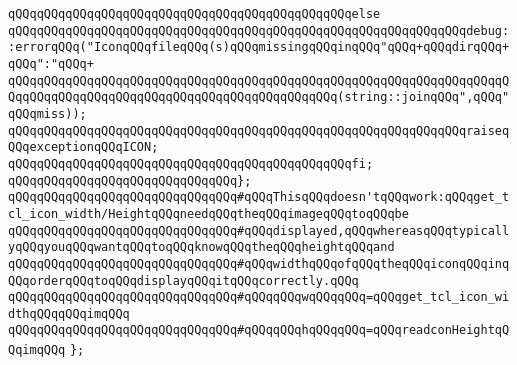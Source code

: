 \verb|qQQqqQQqqQQqqQQqqQQqqQQqqQQqqQQqqQQqqQQqqQQqqQQqelse|\newline
\verb|qQQqqQQqqQQqqQQqqQQqqQQqqQQqqQQqqQQqqQQqqQQqqQQqqQQqqQQqqQQqqQQqdebug::errorqQQq("IconqQQqfileqQQq(s)qQQqmissingqQQqinqQQq"qQQq+qQQqdirqQQq+qQQq":"qQQq+|\newline
\verb|qQQqqQQqqQQqqQQqqQQqqQQqqQQqqQQqqQQqqQQqqQQqqQQqqQQqqQQqqQQqqQQqqQQqqQQqqQQqqQQqqQQqqQQqqQQqqQQqqQQqqQQqqQQqqQQqqQQq(string::joinqQQq",qQQq"qQQqmiss));|\newline
\newline
\verb|qQQqqQQqqQQqqQQqqQQqqQQqqQQqqQQqqQQqqQQqqQQqqQQqqQQqqQQqqQQqqQQqraiseqQQqexceptionqQQqICON;|\newline
\verb|qQQqqQQqqQQqqQQqqQQqqQQqqQQqqQQqqQQqqQQqqQQqqQQqfi;|\newline
\verb|qQQqqQQqqQQqqQQqqQQqqQQqqQQqqQQq};|\newline
\newline
\verb|qQQqqQQqqQQqqQQqqQQqqQQqqQQqqQQq#qQQqThisqQQqdoesn'tqQQqwork:qQQqget_tcl_icon_width/HeightqQQqneedqQQqtheqQQqimageqQQqtoqQQqbe|\newline
\verb|qQQqqQQqqQQqqQQqqQQqqQQqqQQqqQQq#qQQqdisplayed,qQQqwhereasqQQqtypicallyqQQqyouqQQqwantqQQqtoqQQqknowqQQqtheqQQqheightqQQqand|\newline
\verb|qQQqqQQqqQQqqQQqqQQqqQQqqQQqqQQq#qQQqwidthqQQqofqQQqtheqQQqiconqQQqinqQQqorderqQQqtoqQQqdisplayqQQqitqQQqcorrectly.qQQq|\newline
\newline
\verb|qQQqqQQqqQQqqQQqqQQqqQQqqQQqqQQq#qQQqqQQqwqQQqqQQq=qQQqget_tcl_icon_widthqQQqqQQqimqQQq|\newline
\verb|qQQqqQQqqQQqqQQqqQQqqQQqqQQqqQQq#qQQqqQQqhqQQqqQQq=qQQqreadconHeightqQQqimqQQq|\newline
\verb|};|\newline
\newline
\newline
\newline
\newline

